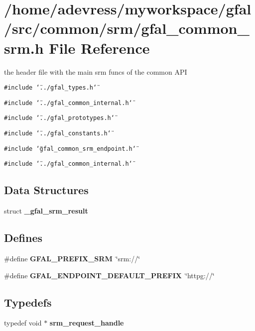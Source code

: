 \section{/home/adevress/myworkspace/gfal/src/common/srm/gfal\_\-common\_\-srm.h File Reference}
\label{gfal__common__srm_8h}
the header file with the main srm funcs of the common API 

{\tt \#include \char`\"{}../gfal\_\-types.h\char`\"{}}\par
{\tt \#include \char`\"{}../gfal\_\-common\_\-internal.h\char`\"{}}\par
{\tt \#include \char`\"{}../gfal\_\-prototypes.h\char`\"{}}\par
{\tt \#include \char`\"{}../gfal\_\-constants.h\char`\"{}}\par
{\tt \#include \char`\"{}gfal\_\-common\_\-srm\_\-endpoint.h\char`\"{}}\par
{\tt \#include \char`\"{}../gfal\_\-common\_\-internal.h\char`\"{}}\par
\subsection*{Data Structures}
\begin{CompactItemize}
\item 
struct \textbf{\_\-gfal\_\-srm\_\-result}
\end{CompactItemize}
\subsection*{Defines}
\begin{CompactItemize}
\item 
\#define \textbf{GFAL\_\-PREFIX\_\-SRM}~\char`\"{}srm://\char`\"{}\label{gfal__common__srm_8h_c163cc407dc64638a5f13fe1d7ceb858}

\item 
\#define \textbf{GFAL\_\-ENDPOINT\_\-DEFAULT\_\-PREFIX}~\char`\"{}httpg://\char`\"{}\label{gfal__common__srm_8h_496c8a18054866dcb27ae3f3397ac303}

\end{CompactItemize}
\subsection*{Typedefs}
\begin{CompactItemize}
\item 
typedef void $\ast$ \textbf{srm\_\-request\_\-handle}\label{gfal__common__srm_8h_87f5a32879caba96e260c7e70c16888f}

\end{CompactItemize}
